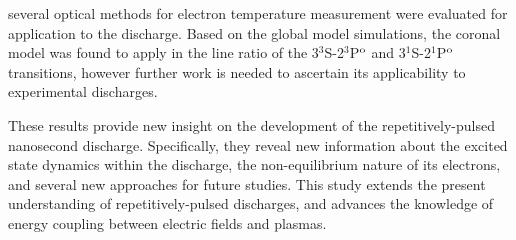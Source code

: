 \noindent several optical methods for electron temperature
measurement were evaluated for application to the discharge. Based on the global
model simulations, the coronal model was found to apply in the line ratio of the
3$^3$S-2$^3$P$^\mathrm{o}$ and 3$^1$S-2$^1$P$^\mathrm{o}$ transitions, however further work is
needed to ascertain its applicability to experimental discharges.

These results provide new insight on the development of the repetitively-pulsed
nanosecond discharge. Specifically, they reveal new information about the
excited state dynamics within the discharge, the non-equilibrium nature of its
electrons, and several new approaches for future studies. This study extends the
present understanding of repetitively-pulsed discharges, and advances the
knowledge of energy coupling between electric fields and plasmas.

